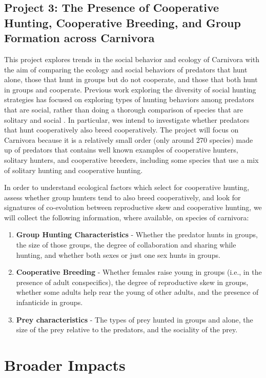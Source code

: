 \subsection{Project 3: The Presence of Cooperative Hunting, Cooperative Breeding, and Group Formation across Carnivora}
This project explores trends in the social behavior and ecology of Carnivora with the aim of comparing the ecology and social behaviors of predators that hunt alone, those that hunt in groups but do not cooperate, and those that both hunt in groups and cooperate. Previous work exploring the diversity of social hunting strategies has focused on exploring types of hunting behaviors among predators that are social, rather than doing a thorough comparison of species that are solitary and social \cite{hansen_mechanisms_2023, lang_multidimensional_2017, bailey_group_2013}. In particular, wes intend to investigate whether predators that hunt cooperatively also breed cooperatively. The project will focus on Carnivora because it is a relatively small order (only around 270 species) made up of predators that contains well known examples of cooperative hunters, solitary hunters, and cooperative breeders, including some species that use a mix of solitary hunting and cooperative hunting.

In order to understand ecological factors which select for cooperative hunting, assess whether group hunters tend to also breed cooperatively, and look for signatures of co-evolution between reproductive skew and cooperative hunting, we will collect the following information, where available, on species of carnivora:
\begin{enumerate}
\item \textbf{Group Hunting Characteristics} - Whether the predator hunts in groups, the size of those groups, the degree of collaboration and sharing while hunting, and whether both sexes or just one sex hunts in groups.
\item \textbf{Cooperative Breeding} - Whether females raise young in groups (i.e., in the presence of adult conspecifics), the degree of reproductive skew in groups, whether some adults help rear the young of other adults, and the presence of infanticide in groups.
\item \textbf{Prey characteristics} - The types of prey hunted in groups and alone, the size of the prey relative to the predators, and the sociality of the prey.
\end{enumerate}


\section{Broader Impacts}

